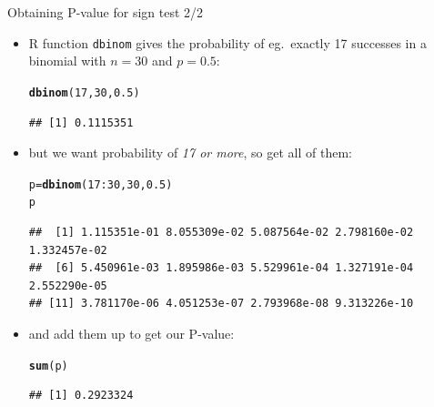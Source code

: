 \documentclass[unknownkeysallowed]{beamer}\usepackage[]{graphicx}\usepackage[]{color}
\makeatletter
\newcommand{\hlnum}[1]{\textcolor[rgb]{0.686,0.059,0.569}{#1}}%
\newcommand{\hlopt}[1]{\textcolor[rgb]{0,0,0}{#1}}%
\newcommand{\hlstd}[1]{\textcolor[rgb]{0.345,0.345,0.345}{#1}}%
\newcommand{\hlkwb}[1]{\textcolor[rgb]{0.69,0.353,0.396}{#1}}%
\newcommand{\hlkwd}[1]{\textcolor[rgb]{0.737,0.353,0.396}{\textbf{#1}}}%
\newenvironment{kframe}{%
 \def\at@end@of@kframe{}%
 \ifinner\ifhmode%
  \def\at@end@of@kframe{\end{minipage}}%
  \begin{minipage}{\columnwidth}%
 \fi\fi%
 \def\FrameCommand##1{\hskip\@totalleftmargin \hskip-\fboxsep
 \colorbox{shadecolor}{##1}\hskip-\fboxsep
     \hskip-\linewidth \hskip-\@totalleftmargin \hskip\columnwidth}%
 \MakeFramed {\advance\hsize-\width
   \@totalleftmargin\z@ \linewidth\hsize
   \@setminipage}}%
 {\par\unskip\endMakeFramed%
 \at@end@of@kframe}
\newenvironment{knitrout}{}{} %
\makeatother
\begin{document}
\begin{frame}[fragile]{Obtaining P-value for sign test 2/2}
  \begin{itemize}
\item R function \texttt{dbinom} gives the probability of eg.\ exactly
  17 successes in a binomial with $n=30$ and $p=0.5$:
  
\begin{knitrout}
\color{fgcolor}\begin{kframe}
\begin{alltt}
\hlkwd{dbinom}\hlstd{(}\hlnum{17}\hlstd{,}\hlnum{30}\hlstd{,}\hlnum{0.5}\hlstd{)}
\end{alltt}
\begin{verbatim}
## [1] 0.1115351
\end{verbatim}
\end{kframe}
\end{knitrout}
\item but we want probability of \emph{17 or more}, so get all of them:
  
\begin{knitrout}
\color{fgcolor}\begin{kframe}
\begin{alltt}
\hlstd{p}\hlkwb{=}\hlkwd{dbinom}\hlstd{(}\hlnum{17}\hlopt{:}\hlnum{30}\hlstd{,}\hlnum{30}\hlstd{,}\hlnum{0.5}\hlstd{)}
\hlstd{p}
\end{alltt}
\begin{verbatim}
##  [1] 1.115351e-01 8.055309e-02 5.087564e-02 2.798160e-02 1.332457e-02
##  [6] 5.450961e-03 1.895986e-03 5.529961e-04 1.327191e-04 2.552290e-05
## [11] 3.781170e-06 4.051253e-07 2.793968e-08 9.313226e-10
\end{verbatim}
\end{kframe}
\end{knitrout}
\item and add them up to get our P-value:
  
\begin{knitrout}
\color{fgcolor}\begin{kframe}
\begin{alltt}
\hlkwd{sum}\hlstd{(p)}
\end{alltt}
\begin{verbatim}
## [1] 0.2923324
\end{verbatim}
\end{kframe}
\end{knitrout}
  \end{itemize}
\end{frame}
\end{document}
